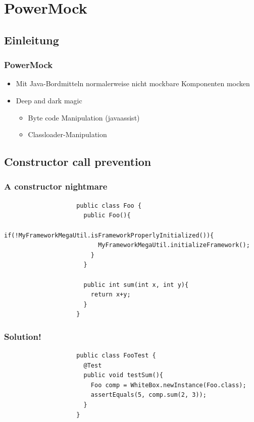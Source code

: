 \documentclass{beamer}
\begin{document}
	
	\section{PowerMock}

		\subsection{Einleitung}

			\begin{frame}
				\frametitle{PowerMock}

				\begin{itemize}
					\item{Mit Java-Bordmitteln normalerweise nicht mockbare Komponenten mocken}
					\item{Deep and dark magic}
						\begin{itemize}
							\item{Byte code Manipulation (javaassist)}
							\item{Classloader-Manipulation}
						\end{itemize}
				\end{itemize}
			\end{frame}

		\subsection{Constructor call prevention}

			\begin{frame}[fragile]
				\frametitle{A constructor nightmare}

				\begin{lstlisting}
					public class Foo {
					  public Foo(){
					    if(!MyFrameworkMegaUtil.isFrameworkProperlyInitialized()){
					      MyFrameworkMegaUtil.initializeFramework();	
					    }
					  }

					  public int sum(int x, int y){
					    return x+y;
					  }
					}
				\end{lstlisting}
			\end{frame}

			\begin{frame}[fragile]
				\frametitle{Solution!}

				\begin{lstlisting}
					public class FooTest {
					  @Test
					  public void testSum(){
					    Foo comp = WhiteBox.newInstance(Foo.class);
					    assertEquals(5, comp.sum(2, 3));
					  }
					}
				\end{lstlisting}
			\end{frame}
\end{document}
